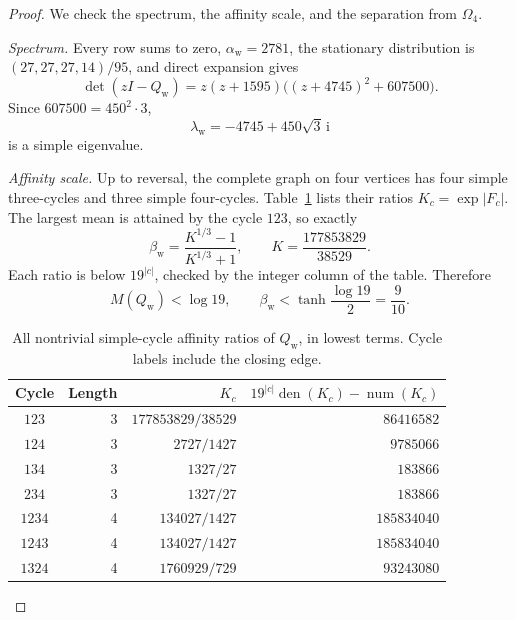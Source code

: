 \documentclass[11pt,a4paper]{article}
\numberwithin{equation}{section}
\theoremstyle{definition}
\theoremstyle{remark}
\newcommand{\ii}{\mathrm{i}}
\newcommand{\Om}{\Omega}
\newcommand{\Qw}{Q_{\mathrm{w}}}
\newcommand{\bw}{\beta_{\mathrm{w}}}
\newcommand{\aw}{\alpha_{\mathrm{w}}}
\newcommand{\lw}{\lambda_{\mathrm{w}}}
\begin{document}
\begin{proof}
We check the spectrum, the affinity scale, and the separation from
\(\Om_4\).

\emph{Spectrum.} Every row sums to zero, \(\aw=2781\), the stationary
distribution is \((27,27,27,14)/95\), and direct expansion gives
\begin{equation}
\det(zI-\Qw)=z(z+1595)\bigl((z+4745)^2+607500\bigr).
\label{eq:charstar}
\end{equation}
Since \(607500=450^2\cdot3\),
\begin{equation}
\lw=-4745+450\sqrt3\,\ii
\label{eq:lambdastar}
\end{equation}
is a simple eigenvalue.

\emph{Affinity scale.} Up to reversal, the complete graph on four
vertices has four simple three-cycles and three simple four-cycles.
Table~\ref{tab:cycles} lists their ratios \(K_c=\exp|F_c|\). The
largest mean is attained by the cycle \(123\), so exactly
\begin{equation}
\bw=\frac{K^{1/3}-1}{K^{1/3}+1},\qquad K=\frac{177853829}{38529}.
\end{equation}
Each ratio is below \(19^{|c|}\), checked by the integer column of the
table. Therefore
\begin{equation}
M(\Qw)<\log19,\qquad
\bw<\tanh\frac{\log19}{2}=\frac9{10}.
\label{eq:beta_bound}
\end{equation}

\begin{table}[t]
\centering
\small
\begin{tabular}{@{}crrr@{}}
\toprule
Cycle & Length & \(K_c\) & \(19^{|c|}\operatorname{den}(K_c)-\operatorname{num}(K_c)\)\\
\midrule
\(123\) & 3 & \(177853829/38529\) & \(86416582\)\\
\(124\) & 3 & \(2727/1427\) & \(9785066\)\\
\(134\) & 3 & \(1327/27\) & \(183866\)\\
\(234\) & 3 & \(1327/27\) & \(183866\)\\
\(1234\) & 4 & \(134027/1427\) & \(185834040\)\\
\(1243\) & 4 & \(134027/1427\) & \(185834040\)\\
\(1324\) & 4 & \(1760929/729\) & \(93243080\)\\
\bottomrule
\end{tabular}
\caption{All nontrivial simple-cycle affinity ratios of \(\Qw\), in
lowest terms. Cycle labels include the closing edge.}
\label{tab:cycles}
\end{table}


\end{proof}
\end{document}
